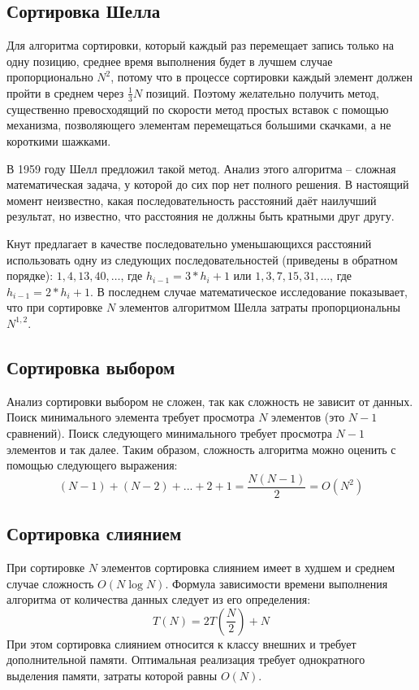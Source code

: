 \subsection{Сортировка Шелла}
Для алгоритма сортировки, который каждый раз перемещает запись только на одну позицию, среднее время
выполнения будет в лучшем случае пропорционально $N^2$, потому что в процессе сортировки каждый элемент
должен пройти в среднем через $\frac{1}{3}N$ позиций. Поэтому желательно получить метод, существенно 
превосходящий по скорости метод простых вставок с помощью механизма, позволяющего элементам перемещаться
большими скачками, а не короткими шажками\cite{Knuth3}.\par
В 1959 году Шелл предложил такой метод. Анализ этого алгоритма – сложная математическая задача, у 
которой до сих пор нет полного решения\cite{sortagain:website}. В настоящий момент неизвестно, какая последовательность 
расстояний даёт наилучший результат, но известно, что расстояния не должны быть кратными друг другу.\par 
Кнут предлагает в качестве последовательно уменьшающихся расстояний использовать одну из следующих 
последовательностей (приведены в обратном порядке): $1,4,13,40,…$, где $h_{i-1}=3*h_{i}+1$ или 
$1,3,7,15,31,…$, где $h_{i-1}=2*h_{i}+1$. В последнем случае математическое исследование показывает, 
что при сортировке $N$ элементов алгоритмом Шелла затраты пропорциональны $N^{1,2}$.

\subsection{Сортировка выбором}
Анализ сортировки выбором не сложен, так как сложность не зависит от данных. Поиск минимального элемента
требует просмотра $N$ элементов (это $N-1$ сравнений). Поиск следующего минимального требует просмотра $N-1$ 
элементов и так далее. Таким образом, сложность алгоритма можно оценить с помощью следующего выражения:
$$(N-1)+(N-2)+...+2+1 = \frac{N(N-1)}{2} = O(N^2)$$

\subsection{Сортировка слиянием}
При сортировке $N$ элементов сортировка слиянием имеет в худшем и среднем случае сложность $O(N\log{N})$.
Формула зависимости времени выполнения алгоритма от количества данных следует из его определения\cite{mergesort:wiki}:
$$T(N) = 2T(\frac{N}{2}) + N$$
При этом сортировка слиянием относится к классу внешних и требует дополнительной памяти. Оптимальная реализация
требует однократного выделения памяти, затраты которой равны $O(N)$.